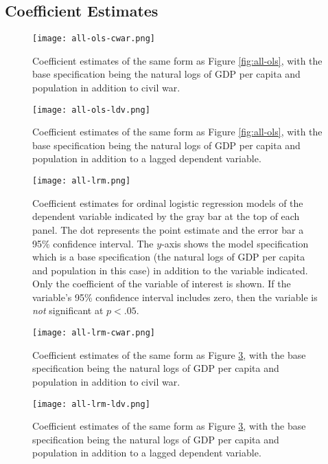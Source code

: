 \documentclass[11pt]{article}
\begin{document}
\clearpage

\subsection{Coefficient Estimates}

\begin{figure}[!htpb]
\texttt{[image: all-ols-cwar.png]}
\caption{Coefficient estimates of the same form as Figure \ref{fig:all-ols}, with the base specification being the natural logs of GDP per capita and population in addition to civil war.}
\label{fig:all-ols-cwar}
\end{figure}

\begin{figure}[!htpb]
\texttt{[image: all-ols-ldv.png]}
\caption{Coefficient estimates of the same form as Figure \ref{fig:all-ols}, with the base specification being the natural logs of GDP per capita and population in addition to a lagged dependent variable.}
\label{fig:all-ols-ldv}
\end{figure}

\begin{figure}[!htpb]
\texttt{[image: all-lrm.png]}
\caption{Coefficient estimates for ordinal logistic regression models of the dependent variable indicated by the gray bar at the top of each panel. The dot represents the point estimate and the error bar a 95\% confidence interval. The $y$-axis shows the model specification which is a base specification (the natural logs of GDP per capita and population in this case) in addition to the variable indicated. Only the coefficient of the variable of interest is shown. If the variable's 95\% confidence interval includes zero, then the variable is \textit{not} significant at $p < .05$.}
\label{fig:all-lrm}
\end{figure}

\begin{figure}[!htpb]
\texttt{[image: all-lrm-cwar.png]}
\caption{Coefficient estimates of the same form as Figure \ref{fig:all-lrm}, with the base specification being the natural logs of GDP per capita and population in addition to civil war.}
\label{fig:all-lrm-cwar}
\end{figure}

\begin{figure}[!htpb]
\texttt{[image: all-lrm-ldv.png]}
\caption{Coefficient estimates of the same form as Figure \ref{fig:all-lrm}, with the base specification being the natural logs of GDP per capita and population in addition to a lagged dependent variable.}
\label{fig:all-lrm-ldv}
\end{figure}
\end{document}
